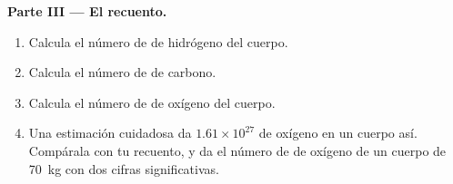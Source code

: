 \begin{problem}
\medskip
\noindent\textbf{Parte III --- El recuento.}
\begin{enumerate}[resume]
  \item Calcula el número de  de hidrógeno del cuerpo.
  \item Calcula el número de  de carbono.
  \item Calcula el número de  de oxígeno del cuerpo.
  \item Una estimación cuidadosa da $1.61 \times 10^{27}$  de
        oxígeno en un cuerpo así. Compárala con tu recuento, y da el
        número de  de oxígeno de un cuerpo de \qty{70}{kg} con dos
        cifras significativas.
\end{enumerate}
\end{problem}
